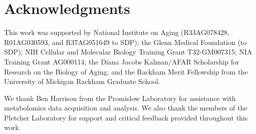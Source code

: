 \section*{Acknowledgments}

This work was supported by National Institute on Aging (R33AG078428, R01AG030593, and R37AG051649 to SDP); the Glenn Medical Foundation (to SDP); NIH Cellular and Molecular Biology Training Grant T32-GM007315; NIA Training Grant AG000114; the Diana Jacobs Kalman/AFAR Scholarship for Research on the Biology of Aging; and the Rackham Merit Fellowship from the University of Michigan Rackham Graduate School.

We thank Ben Harrison from the Promislow Laboratory for assistance with metabolomics data acquisition and analysis. 
We also thank the members of the Pletcher Laboratory for support and critical feedback provided throughout this work.

